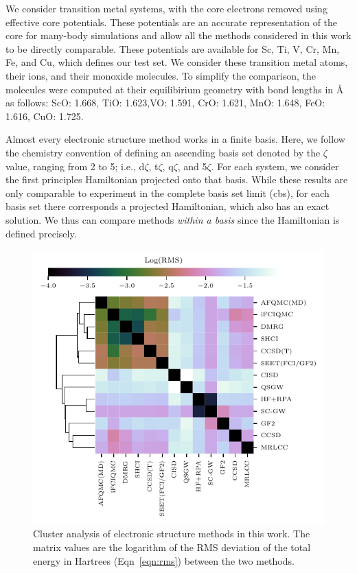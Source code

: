 We consider transition metal systems, with the core electrons removed using effective core potentials\cite{trail_pseudopotentials_2013,trail_correlated_2015}. 
These potentials are an accurate representation of the core\cite{bennett_new_2017} for many-body simulations and allow all the methods considered in this work to be directly comparable. 
These potentials are available for Sc, Ti, V, Cr, Mn, Fe, and Cu, which defines our test set. 
We consider these transition metal atoms, their ions, and their monoxide molecules.
To simplify the comparison, the molecules were computed at their equilibirium geometry with bond lengths in {\AA} as follows: 
ScO: 1.668, TiO: 1.623,VO: 1.591, CrO: 1.621, MnO: 1.648, FeO: 1.616, CuO: 1.725.


Almost every electronic structure method works in a finite basis. 
Here, we follow the chemistry convention of defining an ascending basis set denoted by the $\zeta$ value, ranging from 2 to 5; i.e., d$\zeta$, t$\zeta$, q$\zeta$, and 5$\zeta$. 
For each system, we consider the first principles Hamiltonian projected onto that basis. 
While these results are only comparable to experiment in the complete basis set limit (cbs), for each basis set there corresponds a projected Hamiltonian, which also has an exact solution. 
We thus can compare methods \textit{within a basis} since the Hamiltonian is defined precisely. 

\begin{figure}
\begin{center}
\includegraphics{figs/clustermap}
\caption{Cluster analysis of electronic structure methods in this work. 
The matrix values are the logarithm of the RMS deviation of the total energy in Hartrees (Eqn~\ref{eqn:rms}) between the two methods.}
    \label{fig:clustermap}
\end{center}
\end{figure}

